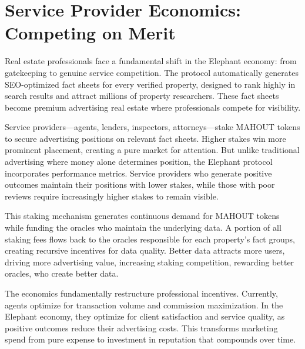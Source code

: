 \section{Service Provider Economics: Competing on Merit}

Real estate professionals face a fundamental shift in the Elephant economy: from gatekeeping to genuine service competition. The protocol automatically generates SEO-optimized fact sheets for every verified property, designed to rank highly in search results and attract millions of property researchers. These fact sheets become premium advertising real estate where professionals compete for visibility.

Service providers—agents, lenders, inspectors, attorneys—stake MAHOUT tokens to secure advertising positions on relevant fact sheets. Higher stakes win more prominent placement, creating a pure market for attention. But unlike traditional advertising where money alone determines position, the Elephant protocol incorporates performance metrics. Service providers who generate positive outcomes maintain their positions with lower stakes, while those with poor reviews require increasingly higher stakes to remain visible.

This staking mechanism generates continuous demand for MAHOUT tokens while funding the oracles who maintain the underlying data. A portion of all staking fees flows back to the oracles responsible for each property's fact groups, creating recursive incentives for data quality. Better data attracts more users, driving more advertising value, increasing staking competition, rewarding better oracles, who create better data.

The economics fundamentally restructure professional incentives. Currently, agents optimize for transaction volume and commission maximization. In the Elephant economy, they optimize for client satisfaction and service quality, as positive outcomes reduce their advertising costs. This transforms marketing spend from pure expense to investment in reputation that compounds over time.

